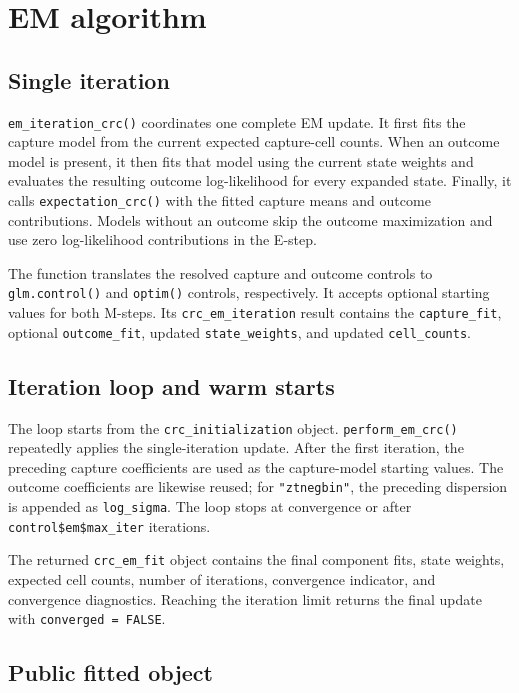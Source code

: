 \documentclass[11pt,letterpaper]{article}
\begin{document}
\section{EM algorithm}

\subsection{Single iteration}

\texttt{em\_iteration\_crc()} coordinates one complete EM update. It first
fits the capture model from the current expected capture-cell counts. When an
outcome model is present, it then fits that model using the current state
weights and evaluates the resulting outcome log-likelihood for every expanded
state. Finally, it calls \texttt{expectation\_crc()} with the fitted capture
means and outcome contributions. Models without an outcome skip the outcome
maximization and use zero log-likelihood contributions in the E-step.

The function translates the resolved capture and outcome controls to
\texttt{glm.control()} and \texttt{optim()} controls, respectively. It accepts
optional starting values for both M-steps. Its \texttt{crc\_em\_iteration}
result contains the \texttt{capture\_fit}, optional \texttt{outcome\_fit},
updated \texttt{state\_weights}, and updated \texttt{cell\_counts}.

\subsection{Iteration loop and warm starts}

The loop starts from the \texttt{crc\_initialization} object.
\texttt{perform\_em\_crc()} repeatedly applies the single-iteration update.
After the first iteration, the preceding capture coefficients are used as the
capture-model starting values. The outcome coefficients are likewise reused; for
\texttt{"ztnegbin"}, the preceding dispersion is appended as
\texttt{log\_sigma}. The loop stops at convergence or after
\texttt{control\$em\$max\_iter} iterations.

The returned \texttt{crc\_em\_fit} object contains the final component fits,
state weights, expected cell counts, number of iterations, convergence
indicator, and convergence diagnostics. Reaching the iteration limit returns
the final update with \texttt{converged = FALSE}.

\subsection{Public fitted object}
\end{document}
